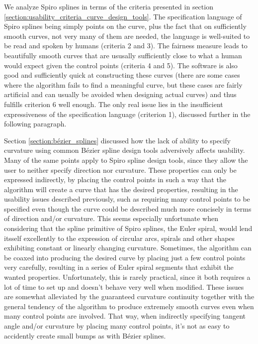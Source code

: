 \documentclass[a4paper]{article}
\begin{document}
				We analyze Spiro splines in terms of the criteria presented in section \ref{section:usability_criteria_curve_design_tools}. The specification language of Spiro splines being simply points on the curve, plus the fact that on sufficiently smooth curves, not very many of them are needed, the language is well-suited to be read and spoken by humans (criteria 2 and 3). The fairness measure leads to beautifully smooth curves that are ususally sufficiently close to what a human would expect given the control points (criteria 4 and 5). The software is also good and sufficiently quick at constructing these curves (there are some cases where the algorithm fails to find a meaningful curve, but these cases are fairly artificial and can usually be avoided when designing actual curves) and thus fulfills criterion 6 well enough. The only real issue lies in the insufficient expressiveness of the specification language (criterion 1), discussed further in the following paragraph.

				Section \ref{section:bézier_splines} discussed how the lack of ability to specify curvature using common Bézier spline design tools adversively affects usability. Many of the same points apply to Spiro spline design tools, since they allow the user to neither specify direction nor curvature. These properties can only be expressed indirectly, by placing the control points in such a way that the algorithm will create a curve that has the desired properties, resulting in the usability issues described previously, such as requiring many control points to be specified even though the curve could be described much more concisely in terms of direction and/or curvature. This seems especially unfortunate when considering that the spline primitive of Spiro splines, the Euler spiral, would lend itsself excellently to the expression of circular arcs, spirals and other shapes exhibiting constant or linearly changing curvature. Sometimes, the algorithm can be coaxed into producing the desired curve by placing just a few control points very carefully, resulting in a series of Euler spiral segments that exhibit the wanted properties. Unfortunately, this is rarely practical, since it both requires a lot of time to set up and doesn't behave very well when modified. These issues are somewhat alleviated by the guaranteed curvature continuity together with the general tendency of the algorithm to produce extremely smooth curves even when many control points are involved. That way, when indirectly specifying tangent angle and/or curvature by placing many control points, it's not as easy to accidently create small bumps as with Bézier splines.
\end{document}
